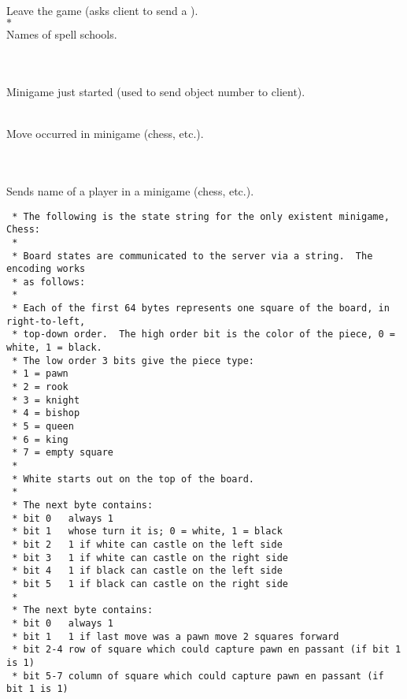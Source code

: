 \begin{protocol}
 \\
Leave the game (asks client to send a ). \\

  $*$ \\
Names of spell schools. \\
\\

   \\
Minigame just started (used to send object number to client). \\


    \\
Move occurred in minigame (chess, etc.). \\
\\

   \\
Sends name of a player in a minigame (chess, etc.). \\

\end{protocol}

\begin{verbatim}
 * The following is the state string for the only existent minigame, Chess:
 *
 * Board states are communicated to the server via a string.  The encoding works
 * as follows:
 *
 * Each of the first 64 bytes represents one square of the board, in right-to-left,
 * top-down order.  The high order bit is the color of the piece, 0 = white, 1 = black.
 * The low order 3 bits give the piece type:
 * 1 = pawn
 * 2 = rook
 * 3 = knight
 * 4 = bishop
 * 5 = queen
 * 6 = king
 * 7 = empty square
 *
 * White starts out on the top of the board.
 *
 * The next byte contains:
 * bit 0   always 1
 * bit 1   whose turn it is; 0 = white, 1 = black
 * bit 2   1 if white can castle on the left side
 * bit 3   1 if white can castle on the right side
 * bit 4   1 if black can castle on the left side
 * bit 5   1 if black can castle on the right side
 *
 * The next byte contains:
 * bit 0   always 1
 * bit 1   1 if last move was a pawn move 2 squares forward
 * bit 2-4 row of square which could capture pawn en passant (if bit 1 is 1)
 * bit 5-7 column of square which could capture pawn en passant (if bit 1 is 1)
\end{verbatim}

